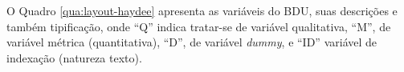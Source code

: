O Quadro \ref{qua:layout-haydee} apresenta as variáveis do BDU, suas descrições e também tipificação, onde ``Q'' indica tratar-se de variável qualitativa, ``M'', de variável métrica (quantitativa), ``D'', de variável \textit{dummy}, e ``ID'' variável de indexação (natureza texto).

\newcommand{\layoutTamColA}{0.75cm}
\newcommand{\layoutTamColB}{3.20cm}
\newcommand{\layoutTamColC}{4.20cm}
\newcommand{\layoutTamColD}{0.90cm}
\newcommand{\layoutTamColE}{4.50cm}
\newcommand{\layoutColA}[2]{%
	\multicolumn{1}{|c|}{\multirow{#1}{\layoutTamColA}{\centering#2}}%
}
\newcommand{\layoutColB}[2]{\multicolumn{1}{c|}{\multirow{#1}{\layoutTamColB}{\centering#2}}}
\newcommand{\layoutColC}[2]{\multicolumn{1}{c|}{\multirow{#1}{\layoutTamColC}{\centering#2}}}
\newcommand{\layoutColD}[2]{\multicolumn{1}{c|}{\multirow{#1}{\layoutTamColD}{\centering#2}}}

